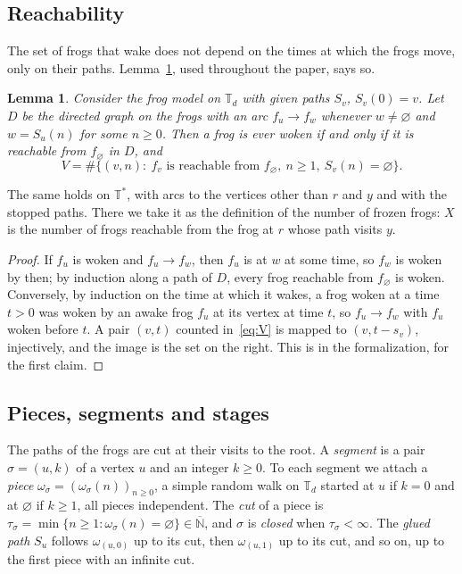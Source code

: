 \documentclass[11pt]{amsart}
\newtheorem{lemma}[theorem]{Lemma}
\theoremstyle{definition}
\numberwithin{equation}{section}
\newcommand{\lean}[1]{\ignorespaces}
\newcommand{\T}{\mathbb{T}}
\newcommand{\Ts}{\mathbb{T}^{*}}
\newcommand{\Nb}{\overline{\mathbb{N}}}
\begin{document}
\subsection{Reachability}\label{sec:reach}
The set of frogs that wake does not depend on the times at which the frogs move, only on their paths. Lemma~\ref{lem:reach}, used throughout the paper, says so.

\begin{lemma}\label{lem:reach}\lean{FrogModel.woken_iff_reach, FrogModel.encard_visits}
Consider the frog model on $\T_d$ with given paths $S_v$, $S_v(0)=v$. Let $D$ be the directed graph on the frogs with an arc $f_u\to f_w$ whenever $w\neq\varnothing$ and $w=S_u(n)$ for some $n\ge0$. Then a frog is ever woken if and only if it is reachable from $f_\varnothing$ in $D$, and
\[
V=\#\{(v,n):\ f_v \text{ is reachable from } f_\varnothing,\ n\ge1,\ S_v(n)=\varnothing\}.
\]
\end{lemma}

The same holds on $\Ts$, with arcs to the vertices other than $r$ and $y$ and with the stopped paths. There we take it as the definition of the number of frozen frogs: $X$ is the number of frogs reachable from the frog at $r$ whose path visits $y$.

\begin{proof}
If $f_u$ is woken and $f_u\to f_w$, then $f_u$ is at $w$ at some time, so $f_w$ is woken by then; by induction along a path of $D$, every frog reachable from $f_\varnothing$ is woken. Conversely, by induction on the time at which it wakes, a frog woken at a time $t>0$ was woken by an awake frog $f_u$ at its vertex at time $t$, so $f_u\to f_w$ with $f_u$ woken before $t$. A pair $(v,t)$ counted in~\eqref{eq:V} is mapped to $(v,t-s_v)$, injectively, and the image is the set on the right. This is  in the formalization, for the first claim.
\end{proof}

\subsection{Pieces, segments and stages}\label{sec:stages}
The paths of the frogs are cut at their visits to the root. A \emph{segment} is a pair $\sigma=(u,k)$ of a vertex $u$ and an integer $k\ge0$. To each segment we attach a \emph{piece} $\omega_\sigma=(\omega_\sigma(n))_{n\ge0}$, a simple random walk on $\T_d$ started at $u$ if $k=0$ and at $\varnothing$ if $k\ge1$, all pieces independent. The \emph{cut} of a piece is $\tau_\sigma=\min\{n\ge1:\omega_\sigma(n)=\varnothing\}\in\Nb$, and $\sigma$ is \emph{closed} when $\tau_\sigma<\infty$. The \emph{glued path} $S_u$ follows $\omega_{(u,0)}$ up to its cut, then $\omega_{(u,1)}$ up to its cut, and so on, up to the first piece with an infinite cut.
\end{document}
